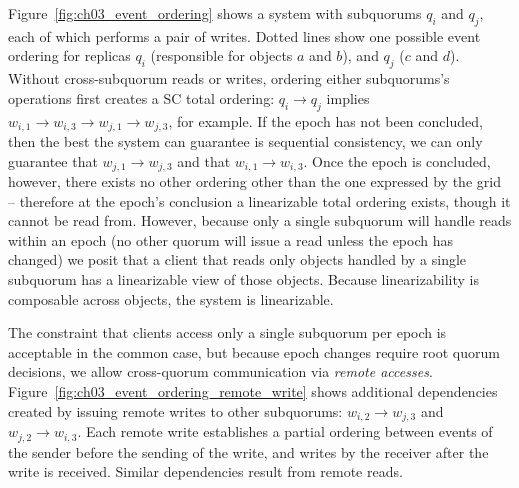 Figure~\ref{fig:ch03_event_ordering} shows a system with subquorums $q_i$ and $q_j$, each of which performs a pair of writes.
Dotted lines show one possible event ordering for replicas $q_i$ (responsible for objects $a$ and $b$), and $q_j$ ($c$ and $d$).
Without cross-subquorum reads or writes, ordering either subquorums's operations first creates a SC total ordering: $q_i \rightarrow q_j$ implies $w_{i,1} \rightarrow w_{i,3} \rightarrow w_{j,1} \rightarrow w_{j,3}$, for example.
If the epoch has not been concluded, then the best the system can guarantee is sequential consistency, we can only guarantee that $w_{j,1} \rightarrow w_{j,3}$ and that $w_{i,1} \rightarrow w_{i,3}$.
Once the epoch is concluded, however, there exists no other ordering other than the one expressed by the grid -- therefore at the epoch's conclusion a linearizable total ordering exists, though it cannot be read from.
However, because only a single subquorum will handle reads within an epoch (no other quorum will issue a read unless the epoch has changed) we posit that a client that reads only objects handled by a single subquorum has a linearizable view of those objects.
Because linearizability is composable across objects, the system is linearizable.

The constraint that clients access only a single subquorum per epoch is acceptable in the common case, but because epoch changes require root quorum decisions, we allow cross-quorum communication via \emph{remote accesses}.
Figure~\ref{fig:ch03_event_ordering_remote_write} shows additional dependencies created by issuing remote writes to other subquorums: $w_{i,2} \rightarrow w_{j,3}$ and $w_{j,2} \rightarrow w_{i,3}$.
Each remote write establishes a partial ordering between events of the sender before the sending of the write, and writes by the receiver after the write is received.
Similar dependencies result from remote reads.

